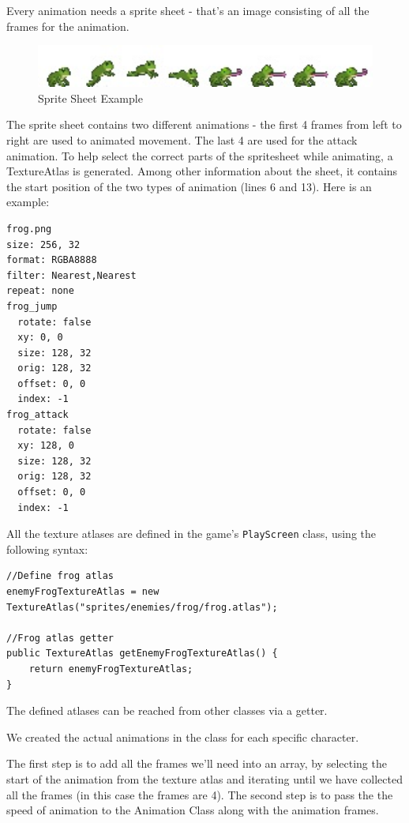 \documentclass[12p]{article}
\begin{document}
Every animation needs a sprite sheet - that's an image consisting of all the frames for the animation.

\begin{figure}[ht]
    \center
    \includegraphics[width=1\textwidth]{Documentation/frog.jpg}
    \caption{Sprite Sheet Example}
    \label{SpriteSheetExample}
\end{figure}

The sprite sheet contains two different animations - the first 4 frames from left to right are used to animated movement. The last 4 are used for the attack animation. To help select the correct parts of the spritesheet while animating, a TextureAtlas is generated. Among other information about the sheet, it contains the start position of the two types of animation (lines 6 and 13). Here is an example:
\begin{verbatim}
frog.png
size: 256, 32
format: RGBA8888
filter: Nearest,Nearest
repeat: none
frog_jump
  rotate: false
  xy: 0, 0
  size: 128, 32
  orig: 128, 32
  offset: 0, 0
  index: -1
frog_attack
  rotate: false
  xy: 128, 0
  size: 128, 32
  orig: 128, 32
  offset: 0, 0
  index: -1
\end{verbatim}

All the texture atlases are defined in the game's \texttt{PlayScreen} class, using the following syntax:
\begin{verbatim}
//Define frog atlas
enemyFrogTextureAtlas = new TextureAtlas("sprites/enemies/frog/frog.atlas");

//Frog atlas getter
public TextureAtlas getEnemyFrogTextureAtlas() {
    return enemyFrogTextureAtlas;
}
\end{verbatim}

The defined atlases can be reached from other classes via a getter.

We created the actual animations in the class for each specific character. 

The first step is to add all the frames we'll need into an array, by selecting the start of the animation from the texture atlas and iterating until we have collected all the frames (in this case the frames are 4).
The second step is to pass the the speed of animation to the Animation Class along with the animation frames.
\end{document}
